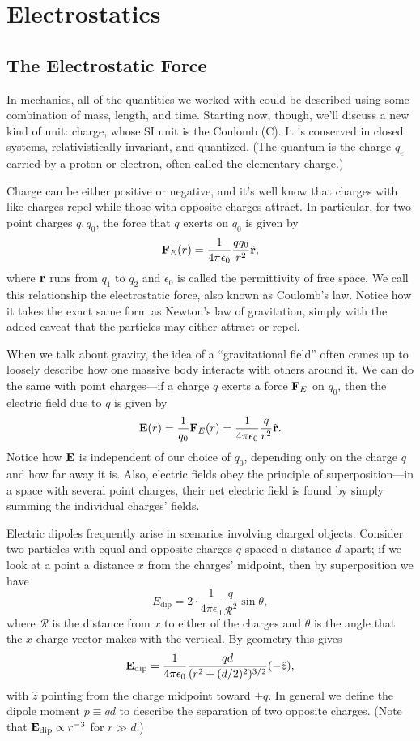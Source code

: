 \documentclass[../p051main.tex]{subfiles}
\begin{document}
\chapter{Electrostatics}
\section{The Electrostatic Force}
In mechanics, all of the quantities we worked with could be described using some combination of mass, length, and time.
Starting now, though, we'll discuss a new kind of unit: charge, whose SI unit is the Coulomb (C).
It is conserved in closed systems, relativistically invariant, and quantized.
(The quantum is the charge $q_e$ carried by a proton or electron, often called the elementary charge.)

Charge can be either positive or negative, and it's well know that charges with like charges repel while those with opposite charges attract.
In particular, for two point charges $q, q_0$, the force that $q$ exerts on $q_0$ is given by
\[ \mathbf{F}_E(r) = \frac{1}{4\pi \epsilon_0} \frac{qq_0}{r^2} \hat{\mathbf{r}}, \]
where $\mathbf{r}$ runs from $q_1$ to $q_2$ and $\epsilon_0$ is called the permittivity of free space.
We call this relationship the electrostatic force, also known as Coulomb's law.
Notice how it takes the exact same form as Newton's law of gravitation, simply with the added caveat that the particles may either attract or repel.

When we talk about gravity, the idea of a ``gravitational field'' often comes up to loosely describe how one massive body interacts with others around it.
We can do the same with point charges---if a charge $q$ exerts a force $\mathbf{F}_E$ on $q_0$, then the electric field due to $q$ is given by
\[ \mathbf{E}(r) = \frac{1}{q_0}\mathbf{F}_E(r) = \frac{1}{4\pi \epsilon_0} \frac{q}{r^2} \hat{\mathbf{r}}. \]
Notice how $\mathbf{E}$ is independent of our choice of $q_0$, depending only on the charge $q$ and how far away it is.
Also, electric fields obey the principle of superposition---in a space with several point charges, their net electric field is found by simply summing the individual charges' fields.

\begin{example}
    Electric dipoles frequently arise in scenarios involving charged objects.
    Consider two particles with equal and opposite charges $q$ spaced a distance $d$ apart; if we look at a point a distance $x$ from the charges' midpoint, then by superposition we have
    \[ E_\textrm{dip} = 2 \cdot \frac{1}{4\pi \epsilon_0} \frac{q}{\mathcal{R}^2} \sin\theta, \]
    where $\mathcal{R}$ is the distance from $x$ to either of the charges and $\theta$ is the angle that the $x$-charge vector makes with the vertical.
    By geometry this gives
    \[ \mathbf{E}_\textrm{dip} = \frac{1}{4\pi\epsilon_0} \frac{qd}{(r^2 + (d / 2)^2)^{3 / 2}} (-\hat z), \]
    with $\hat z$ pointing from the charge midpoint toward $+q$.
    In general we define the dipole moment $p \equiv qd$ to describe the separation of two opposite charges.
    (Note that $\mathbf{E}_\textrm{dip} \propto r^{-3}$ for $r \gg d$.)
\end{example}
\end{document}
